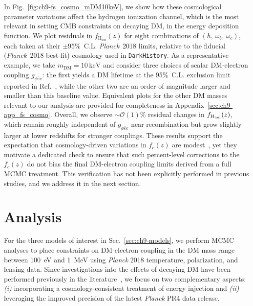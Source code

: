 In Fig.~\ref{fig:ch9-fs_cosmo_mDM10keV}, we show how these cosmological parameter variations affect the hydrogen ionization channel, which is the most relevant in setting CMB constraints on decaying DM, in the energy deposition function. We plot residuals in $f_{\mathrm{H_{ion}}}(z)$ for eight combinations of $(h,\,\omega_b,\,\omega_c)$, each taken at their $\pm 95\%$~C.L. \textit{Planck}~2018 limits, relative to the fiducial  (\textit{Planck}~2018 best-fit) cosmology used in \texttt{DarkHistory}. As a representative example, we take $m_{\mathrm{DM}} = 10\,\mathrm{keV}$ and consider three choices of scalar DM-electron coupling $g_{\phi \bar{e}e}$: the first yields a DM lifetime at the 95\%~C.L. exclusion limit reported in Ref.~\cite{2024arXiv240813305X}, while the other two are an order of magnitude larger and smaller than this baseline value. Equivalent plots for the other DM masses relevant to our analysis are provided for completeness in Appendix~\ref{sec:ch9-app_fs_cosmo}. Overall, we observe $\sim \mathcal{O}(1)\%$ residual changes in $f_{\rm H_{ion}}(z)$, which remain roughly independent of $g_{\phi \bar{e}e}$ near recombination but grow slightly larger at lower redshifts for stronger couplings. These results support the expectation that cosmology-driven variations in $f_c(z)$ are modest~\cite{Liu:2019bbm}, yet they motivate a dedicated check to ensure that such percent-level corrections to the $f_c(z)$ do not bias the final DM-electron coupling limits derived from a full MCMC treatment. This verification has not been explicitly performed in previous studies, and we address it in the next section.


\section{Analysis}
\label{sec:ch9-analysis}

For the three models of interest in Sec.~\ref{sec:ch9-models}, we perform MCMC analyses to place constraints on DM-electron coupling in the DM mass range between 100~eV and 1~MeV using \textit{Planck} 2018 temperature, polarization, and lensing data.
Since investigations into the effects of decaying DM have been performed previously in the literature~\cite{Liu:2023nct, Capozzi:2023xie, 2024arXiv240813305X}, we focus on two complementary aspects: \textit{(i)} incorporating a cosmology-consistent treatment of energy injection and \textit{(ii)} leveraging the improved precision of the latest \textit{Planck} PR4 data release.

